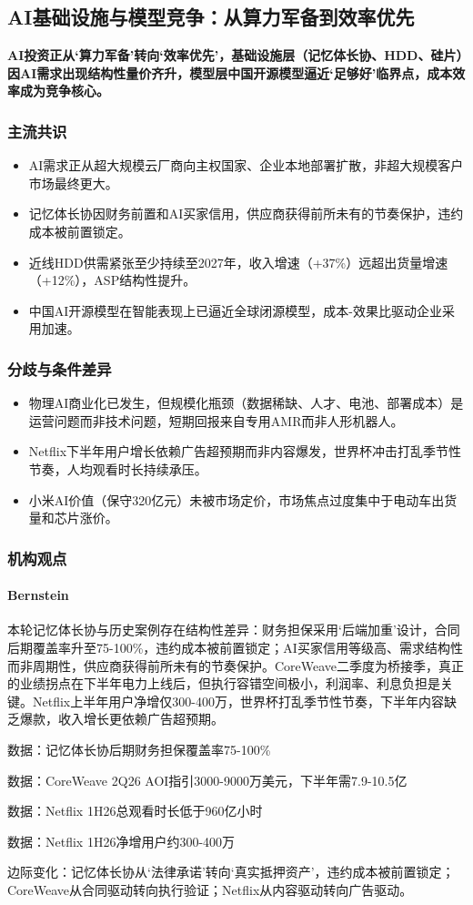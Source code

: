 \documentclass[11pt]{ctexart}
\begin{document}
\subsection{AI基础设施与模型竞争：从算力军备到效率优先}
\textbf{AI投资正从‘算力军备’转向‘效率优先’，基础设施层（记忆体长协、HDD、硅片）因AI需求出现结构性量价齐升，模型层中国开源模型逼近‘足够好’临界点，成本效率成为竞争核心。}
\subsubsection*{主流共识}
\begin{itemize}
  \item AI需求正从超大规模云厂商向主权国家、企业本地部署扩散，非超大规模客户市场最终更大。
  \item 记忆体长协因财务前置和AI买家信用，供应商获得前所未有的节奏保护，违约成本被前置锁定。
  \item 近线HDD供需紧张至少持续至2027年，收入增速（+37\%）远超出货量增速（+12\%），ASP结构性提升。
  \item 中国AI开源模型在智能表现上已逼近全球闭源模型，成本-效果比驱动企业采用加速。
\end{itemize}
\subsubsection*{分歧与条件差异}
\begin{itemize}
  \item 物理AI商业化已发生，但规模化瓶颈（数据稀缺、人才、电池、部署成本）是运营问题而非技术问题，短期回报来自专用AMR而非人形机器人。
  \item Netflix下半年用户增长依赖广告超预期而非内容爆发，世界杯冲击打乱季节性节奏，人均观看时长持续承压。
  \item 小米AI价值（保守320亿元）未被市场定价，市场焦点过度集中于电动车出货量和芯片涨价。
\end{itemize}
\subsubsection*{机构观点}
\paragraph{Bernstein} 本轮记忆体长协与历史案例存在结构性差异：财务担保采用‘后端加重’设计，合同后期覆盖率升至75-100\%，违约成本被前置锁定；AI买家信用等级高、需求结构性而非周期性，供应商获得前所未有的节奏保护。CoreWeave二季度为桥接季，真正的业绩拐点在下半年电力上线后，但执行容错空间极小，利润率、利息负担是关键。Netflix上半年用户净增仅300-400万，世界杯打乱季节性节奏，下半年内容缺乏爆款，收入增长更依赖广告超预期。
{\small\color{refgray}数据：记忆体长协后期财务担保覆盖率75-100\%\par}
{\small\color{refgray}数据：CoreWeave 2Q26 AOI指引3000-9000万美元，下半年需7.9-10.5亿\par}
{\small\color{refgray}数据：Netflix 1H26总观看时长低于960亿小时\par}
{\small\color{refgray}数据：Netflix 1H26净增用户约300-400万\par}
{\small\color{refgray}边际变化：记忆体长协从‘法律承诺’转向‘真实抵押资产’，违约成本被前置锁定；CoreWeave从合同驱动转向执行验证；Netflix从内容驱动转向广告驱动。\par}
\end{document}
